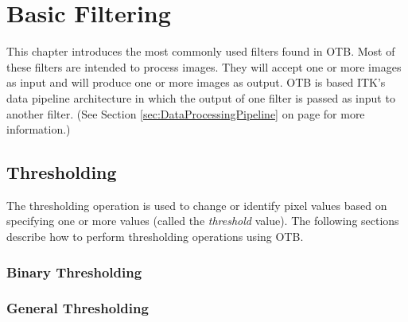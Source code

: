 \chapter{Basic Filtering}


This chapter introduces the most commonly used filters found in OTB.
Most of these filters are intended to process images. They will accept one or
more images as input and will produce one or more images as output. OTB is
based ITK's data pipeline architecture in which the output of one filter is
passed as input to another filter. (See Section
\ref{sec:DataProcessingPipeline} on page \pageref{sec:DataProcessingPipeline}
for more information.)


\section{Thresholding}
\ifitkFullVersion
\label{sec:ThresholdingFiltering}
\fi

The thresholding operation is used to change or identify pixel values based
on specifying one or more values (called the \emph{threshold} value). The
following sections describe how to perform thresholding operations using
OTB.

\subsection{Binary Thresholding}
\label{sec:BinaryThresholdingImageFilter}

\ifitkFullVersion

\fi

\subsection{General Thresholding}
\label{sec:ThresholdingImageFilter}

\ifitkFullVersion

\fi






